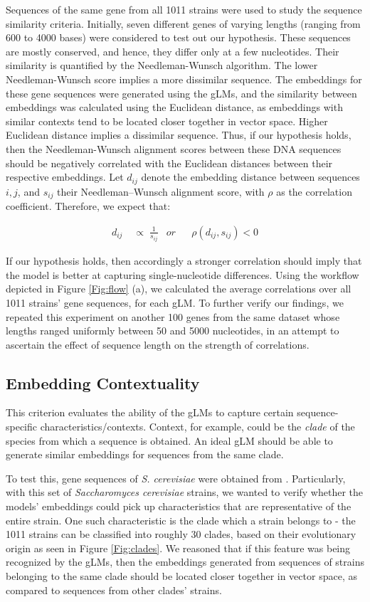 \documentclass{ifacconf}
\begin{document}
Sequences of the same gene from all 1011 strains were used to study the sequence similarity criteria. Initially, seven different genes of varying lengths (ranging from 600 to 4000 bases) were considered to test out our hypothesis. These sequences are mostly conserved, and hence, they differ only at a few nucleotides. Their similarity is quantified by the Needleman-Wunsch algorithm. The lower Needleman-Wunsch score implies a more dissimilar sequence. The embeddings for these gene sequences were generated using the gLMs, and the similarity between embeddings was calculated using the Euclidean distance, as embeddings with similar contexts tend to be located closer together in vector space. Higher Euclidean distance implies a dissimilar sequence. Thus, if our hypothesis holds, then the Needleman-Wunsch alignment scores between these DNA sequences should be negatively correlated with the Euclidean distances between their respective embeddings. Let $d_{ij}$ denote the embedding distance between sequences $i,j$, and $s_{ij}$ their Needleman–Wunsch alignment score, with $\rho$ as the correlation coefficient. Therefore, we expect that:

\vskip -0.1in
\begin{align}
  d_{ij} &\;\propto\; \frac{1}{s_{ij}} & or && \rho(d_{ij},s_{ij}) < 0
\end{align}

If our hypothesis holds, then accordingly a stronger correlation should imply that the model is better at capturing single-nucleotide differences. Using the workflow depicted in Figure \ref{Fig:flow} (a), we calculated the average correlations over all 1011 strains' gene sequences, for each gLM. To further verify our findings, we repeated this experiment on another 100 genes from the same dataset whose lengths ranged uniformly between 50 and 5000 nucleotides, in an attempt to ascertain the effect of sequence length on the strength of correlations.

\subsection{Embedding Contextuality}

This criterion evaluates the ability of the gLMs to capture certain sequence-specific characteristics/contexts. Context, for example, could be the \emph{clade} of the species from which a sequence is obtained. An ideal gLM should be able to generate similar embeddings for sequences from the same clade. 

To test this, gene sequences of \textit{S. cerevisiae} were obtained from  \citet{Peter2018}. Particularly, with this set of \textit{Saccharomyces cerevisiae} strains, we wanted to verify whether the models’ embeddings could pick up characteristics that are representative of the entire strain. One such characteristic is the clade which a strain belongs to - the 1011 strains can be classified into roughly 30 clades, based on their evolutionary origin as seen in Figure \ref{Fig:clades}. We reasoned that if this feature was being recognized by the gLMs, then the embeddings generated from sequences of strains belonging to the same clade should be located closer together in vector space, as compared to sequences from other clades’ strains. 
\end{document}
